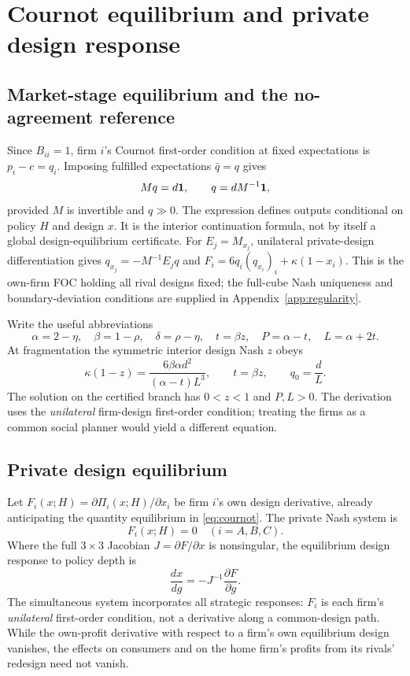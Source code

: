 \documentclass[11pt,a4paper]{article}
\theoremstyle{remark}\newtheorem{remark}[theorem]{Remark}
\begin{document}
\section{Cournot equilibrium and private design response}\label{sec:equilibrium}
\subsection{Market-stage equilibrium and the no-agreement reference}
Since $B_{ii}=1$, firm $i$'s Cournot first-order condition at fixed expectations is $p_i-c=q_i$. Imposing fulfilled expectations $\bar q=q$ gives
\begin{equation}\label{eq:cournot}
M q=d\boldsymbol{1},\qquad q=d M^{-1}\boldsymbol{1},
\end{equation}
provided $M$ is invertible and $q\gg0$. The expression defines outputs conditional on policy $H$ and design $x$. It is the interior continuation formula, not by itself a global design-equilibrium certificate. For $E_j=M_{x_j}$, unilateral private-design differentiation gives $q_{x_j}=-M^{-1}E_jq$ and $F_i=6q_i(q_{x_i})_i+\kappa(1-x_i)$. This is the own-firm FOC holding all rival designs fixed; the full-cube Nash uniqueness and boundary-deviation conditions are supplied in Appendix~\ref{app:regularity}.

Write the useful abbreviations
\begin{equation}\label{eq:abbrev}
\alpha=2-\eta,\quad\beta=1-\rho,\quad\delta=\rho-\eta,\quad
t=\beta z,\quad P=\alpha-t,\quad L=\alpha+2t.
\end{equation}
At fragmentation the symmetric interior design Nash $z$ obeys
\begin{equation}\label{eq:root}
\kappa(1-z)=\frac{6\beta\alpha d^2}{(\alpha-t)L^3},\qquad t=\beta z,\qquad q_0=\frac dL.
\end{equation}
The solution on the certified branch has $0<z<1$ and $P,L>0$. The derivation uses the \emph{unilateral} firm-design first-order condition; treating the firms as a common social planner would yield a different equation.

\subsection{Private design equilibrium}
Let $F_i(x;H)=\partial\Pi_i(x;H)/\partial x_i$ be firm $i$'s own design derivative, already anticipating the quantity equilibrium in \eqref{eq:cournot}. The private Nash system is
\begin{equation}\label{eq:designFOC}
F_i(x;H)=0\quad (i=A,B,C).
\end{equation}
Where the full $3\times3$ Jacobian $J=\partial F/\partial x$ is nonsingular, the equilibrium design response to policy depth is
\begin{equation}\label{eq:implicit}
\frac{dx}{dg}=-J^{-1}\frac{\partial F}{\partial g}.
\end{equation}
The simultaneous system incorporates all strategic responses: $F_i$ is each firm's \emph{unilateral} first-order condition, not a derivative along a common-design path. While the own-profit derivative with respect to a firm's own equilibrium design vanishes, the effects on consumers and on the home firm's profits from its rivals' redesign need not vanish.
\end{document}
